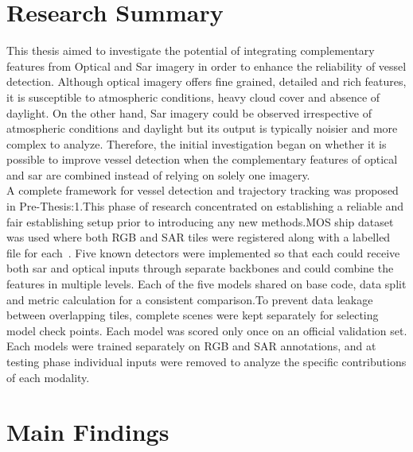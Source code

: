 \section{Research Summary}

This thesis aimed to investigate the potential of integrating complementary features from Optical and Sar imagery in order to enhance the reliability of vessel detection. Although optical imagery offers fine grained, detailed and rich features, it is susceptible to atmospheric conditions, heavy cloud cover and absence of daylight. On the other hand, Sar imagery could be observed irrespective of atmospheric conditions and daylight but its output is typically noisier and more complex to analyze. Therefore, the initial investigation began on whether it is possible to improve vessel detection when the complementary features of optical and sar are combined instead of relying on solely one imagery.\\

A complete framework for vessel detection and trajectory tracking was proposed in Pre-Thesis:1.This phase of research concentrated on establishing a reliable and fair establishing setup prior to introducing any new methods.MOS ship dataset was used where both RGB and SAR tiles were registered along with a labelled file for each~\cite{you2026multi}. Five known detectors were implemented so that each could receive both sar and optical inputs through separate backbones and could combine the features in multiple levels. Each of the five models shared on base code, data split and metric calculation for a consistent comparison.To prevent data leakage between overlapping tiles, complete scenes were kept separately for selecting model check points. Each model was scored only once on an official validation set. Each models were trained separately on RGB and SAR annotations, and at testing phase individual inputs were removed to analyze the specific contributions of each modality.

\section{Main Findings}

